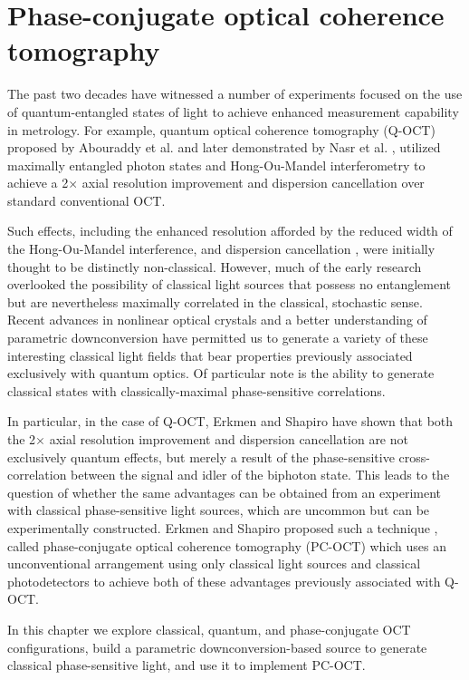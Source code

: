 \chapter{Phase-conjugate optical coherence tomography}

The past two decades have witnessed a number of experiments focused on the use of quantum-entangled states of light to achieve enhanced measurement capability in metrology. For example, quantum optical coherence tomography (Q-OCT) proposed by Abouraddy et al. \cite{abouraddy-qoct} and later demonstrated by Nasr et al. \cite{nasr-qoct}, utilized maximally entangled photon states and Hong-Ou-Mandel interferometry \cite{hong-interference} to achieve a 2$\times$ axial resolution improvement and dispersion cancellation over standard conventional OCT.

Such effects, including the enhanced resolution afforded by the reduced width of the Hong-Ou-Mandel interference, and dispersion cancellation \cite{steinberg-dispersion,franson-dispersion}, were initially thought to be distinctly non-classical. However, much of the early research overlooked the possibility of classical light sources that possess no entanglement but are nevertheless maximally correlated in the classical, stochastic sense. Recent advances in nonlinear optical crystals and a better understanding of parametric downconversion have permitted us to generate a variety of these interesting classical light fields that bear properties previously associated exclusively with quantum optics. Of particular note is the ability to generate classical states with classically-maximal phase-sensitive correlations.

In particular, in the case of Q-OCT, Erkmen and Shapiro \cite{erkmen-pcoct} have shown that both the 2$\times$ axial resolution improvement and dispersion cancellation are not exclusively quantum effects, but merely a result of the phase-sensitive cross-correlation between the signal and idler of the biphoton state. This leads to the question of whether the same advantages can be obtained from an experiment with classical phase-sensitive light sources, which are uncommon but can be experimentally constructed. Erkmen and Shapiro proposed such a technique \cite{erkmen-pcoct}, called phase-conjugate optical coherence tomography (PC-OCT) which uses an unconventional arrangement using only classical light sources and classical photodetectors to achieve both of these advantages previously associated with Q-OCT.

In this chapter we explore classical, quantum, and phase-conjugate OCT configurations, build a parametric downconversion-based source to generate classical phase-sensitive light, and use it to implement PC-OCT.

